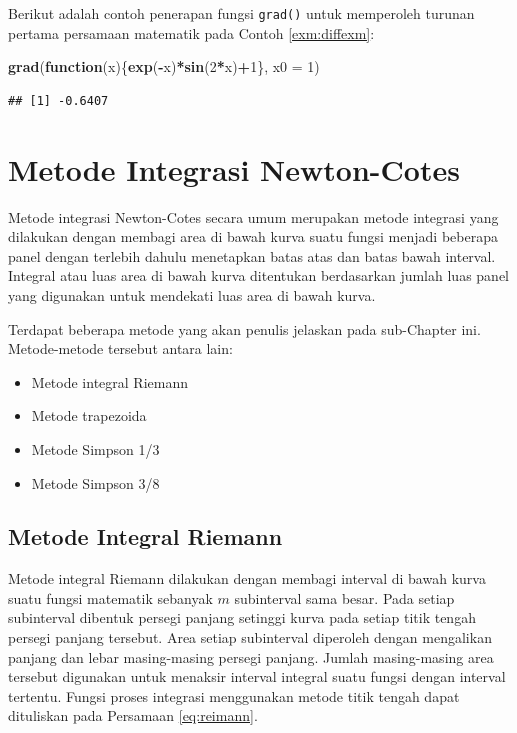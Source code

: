 \documentclass[]{book}
\newenvironment{Shaded}{\begin{snugshade}}{\end{snugshade}}
\newcommand{\ControlFlowTok}[1]{\textcolor[rgb]{0.13,0.29,0.53}{\textbf{#1}}}
\newcommand{\DataTypeTok}[1]{\textcolor[rgb]{0.13,0.29,0.53}{#1}}
\newcommand{\DecValTok}[1]{\textcolor[rgb]{0.00,0.00,0.81}{#1}}
\newcommand{\KeywordTok}[1]{\textcolor[rgb]{0.13,0.29,0.53}{\textbf{#1}}}
\newcommand{\NormalTok}[1]{#1}
\newcommand{\OperatorTok}[1]{\textcolor[rgb]{0.81,0.36,0.00}{\textbf{#1}}}
\providecommand{\tightlist}{%
  \setlength{\itemsep}{0pt}\setlength{\parskip}{0pt}}
\theoremstyle{definition}
\theoremstyle{definition}
\theoremstyle{definition}
\theoremstyle{remark}
\begin{document}
Berikut adalah contoh penerapan fungsi \texttt{grad()} untuk memperoleh turunan pertama persamaan matematik pada Contoh \ref{exm:diffexm}:

\begin{Shaded}
\begin{Highlighting}[]
\KeywordTok{grad}\NormalTok{(}\ControlFlowTok{function}\NormalTok{(x)\{}\KeywordTok{exp}\NormalTok{(}\OperatorTok{-}\NormalTok{x)}\OperatorTok{*}\KeywordTok{sin}\NormalTok{(}\DecValTok{2}\OperatorTok{*}\NormalTok{x)}\OperatorTok{+}\DecValTok{1}\NormalTok{\}, }\DataTypeTok{x0 =} \DecValTok{1}\NormalTok{)}
\end{Highlighting}
\end{Shaded}

\begin{verbatim}
## [1] -0.6407
\end{verbatim}

\hypertarget{newtoncotes}{%
\section{Metode Integrasi Newton-Cotes}\label{newtoncotes}}

Metode integrasi Newton-Cotes secara umum merupakan metode integrasi yang dilakukan dengan membagi area di bawah kurva suatu fungsi menjadi beberapa panel dengan terlebih dahulu menetapkan batas atas dan batas bawah interval. Integral atau luas area di bawah kurva ditentukan berdasarkan jumlah luas panel yang digunakan untuk mendekati luas area di bawah kurva.

Terdapat beberapa metode yang akan penulis jelaskan pada sub-Chapter ini. Metode-metode tersebut antara lain:

\begin{itemize}
\tightlist
\item
  Metode integral Riemann
\item
  Metode trapezoida
\item
  Metode Simpson 1/3
\item
  Metode Simpson 3/8
\end{itemize}

\hypertarget{riemann}{%
\subsection{Metode Integral Riemann}\label{riemann}}

Metode integral Riemann dilakukan dengan membagi interval di bawah kurva suatu fungsi matematik sebanyak \(m\) subinterval sama besar. Pada setiap subinterval dibentuk persegi panjang setinggi kurva pada setiap titik tengah persegi panjang tersebut. Area setiap subinterval diperoleh dengan mengalikan panjang dan lebar masing-masing persegi panjang. Jumlah masing-masing area tersebut digunakan untuk menaksir interval integral suatu fungsi dengan interval tertentu. Fungsi proses integrasi menggunakan metode titik tengah dapat dituliskan pada Persamaan \eqref{eq:reimann}.
\end{document}
